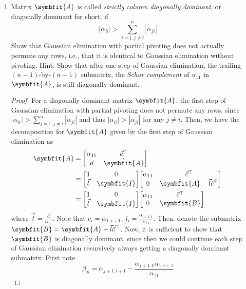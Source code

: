 \documentclass{article}
\theoremstyle{definition}
\newcommand{\mat}[1]{\symbfit{#1}}
\begin{document}
\begin{enumerate}[leftmargin=\labelsep]
	\item Matrix \(\mat{A}\) is called \emph{strictly column diagonally dominant}, or diagonally dominant for short, if
	      \begin{equation}
		      |\alpha_{ii}| > \sum_{j=1, j \neq i}^{n} |\alpha_{ji}| \label{eq:diagdom}
	      \end{equation}
	      Show that Gaussian elimination with partial pivoting does not actually permute any rows, i.e., that it is identical to Gaussian elimination without pivoting. Hint: Show that after one step of Gaussian elimination, the trailing \((n - 1)\text{-by-}(n - 1)\) submatrix, the \emph{Schur complement} of \(\alpha_{11}\) in \(\mat{A}\), is still diagonally dominant.
	      \begin{proof}
		      For a diagonally dominant matrix \(\mat{A}\), the first step of Gaussian elimination with partial pivoting does not permute any rows, since \(|\alpha_{ii}| > \sum_{j=1, j \neq i}^{n} |\alpha_{ji}|\) and thus \(|\alpha_{ii}| > |\alpha_{ji}|\) for any \(j\neq i\). Then, we have the decomposition for \(\mat{A}\) given by the first step of Gaussian elimination as
		      \begin{align*}
			      \mat{A} & = \mqty[\alpha_{11} & \vec{c}^{\top} \\ \vec{a} & \hat{\mat{A}}]                                                                          \\
			              & = \mqty[1           & 0              \\ \vec{l} & \mat{I}] \mqty[\alpha_{11} & \vec{c}^{\top} \\ 0 & \hat{\mat{A}}-\vec{l}\vec{c}^{\top}] \\
			              & = \mqty[1           & 0              \\ \vec{l} & \mat{I}] \mqty[\alpha_{11} & \vec{c}^{\top}                                             \\ 0 & \mat{B}]
		      \end{align*}
		      where \(\vec{l} = \frac{\vec{a}}{\alpha_{11}}\). Note that \(c_i = \alpha_{1,i + 1},\ l_i = \frac{\alpha_{i + 1, 1}}{\alpha_{11}}\). Then, denote the submatrix \(\mat{B}=\hat{\mat{A}}-\vec{l}\vec{c}^{\top}\). Now, it is sufficient to show that \(\mat{B}\) is diagonally dominant, since then we could continue each step of Gaussian elimination recursively always getting a diagonally dominant submatrix. First note
		      \begin{equation}
			      \beta_{ji} = \alpha_{j+1,i+1} - \frac{\alpha_{j+1,1}\alpha_{1,i+1}}{\alpha_{11}} \label{eq:bji}

\end{equation}
\end{proof}
\end{enumerate}
\end{document}
